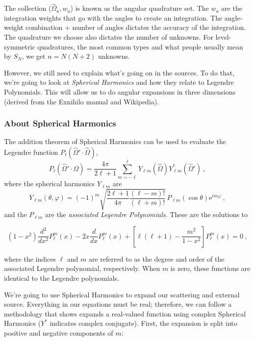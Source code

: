 \documentclass[12pt]{article}
\newcommand{\vOmega}{\ensuremath{\hat{\Omega}}}
\begin{document}
The collection ($\vOmega_a, w_a$) is known as the angular quadrature set. The 
$w_a$ are the integration weights that go with the angles to create an 
integration. The angle-weight combination + number of angles dictates the 
accuracy of the integration. The quadrature we choose also dictates the number 
of unknowns. For level-symmetric quadratures, the most common types and what
people usually mean by $S_{N}$, we get $n=N(N+2)$ unknowns. 

However, we still need to explain what's going on in the sources. To do that, 
we're going to look at \textit{Spherical Harmonics} and how they relate to 
Legendre Polynomials. This will allow us to do angular expansions in three 
dimensions (derived from the Exnihilo manual and Wikipedia). 

\subsubsection*{About Spherical Harmonics}

The addition theorem of Spherical Harmonics can be used to evaluate the
Legendre function $P_{\ell}(\vOmega'\cdot\vOmega)$,
\begin{equation}
  P_{\ell}(\vOmega'\cdot\vOmega) = \frac{4\pi}{2\ell +1}\sum_{m=-\ell }^\ell 
  Y_{\ell m}(\vOmega)Y^{\ast}_{\ell m}(\vOmega')\:,
\end{equation}
where the spherical harmonics $Y_{\ell m}$ are
\begin{equation}
  Y_{\ell m}(\theta,\varphi) = (-1)^m\sqrt
  {
    \frac{2\ell +1}{4\pi}\frac{(\ell-m)!}{(\ell+m)!}
  }\,
  P_{\ell m}(\cos\theta)\mathrm{e}^{im\varphi}\:,
  \label{eq:complete-spherical-harmonics}
\end{equation}
and the $P_{\ell m}$ are the \textit{associated Legendre Polynomials}. These are 
the solutions to

\[
(1-x^{2}){\frac {d^{2}}{dx^{2}}}P_{\ell }^{m}(x)-
2x{\frac {d}{dx}}P_{\ell }^{m}(x)+\left[\ell (\ell +1)-
{\frac {m^{2}}{1-x^{2}}}\right]P_{\ell }^{m}(x)=0\:,
\]

where the indices $\ell$ and $m$ are referred to as the degree and order of the 
associated Legendre polynomial, respectively. When $m$ is zero, these functions
are identical to the Legendre polynomials.

We're going to use Spherical Harmonics to expand our scattering and external 
source. Everything in our equations must be real; therefore, we can follow a 
methodology that shows expands a real-valued function using complex Spherical 
Harmonics ($Y^*$ indicates complex conjugate).  First,
the expansion is split into positive and negative components of $m$:
\end{document}
